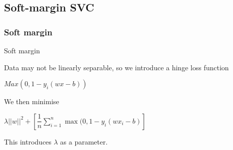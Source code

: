 
\subsection{Soft-margin SVC}

\subsubsection{Soft margin}

Soft margin

Data may not be linearly separable, so we introduce a hinge loss function

\(Max(0, 1-y_i(wx-b))\)

We then minimise

\(\lambda ||w||^2+ [\dfrac{1}{n}\sum_{i=1}^n \max (0, 1-y_i(wx_i-b)]\)

This introduces \(\lambda\) as a parameter.

